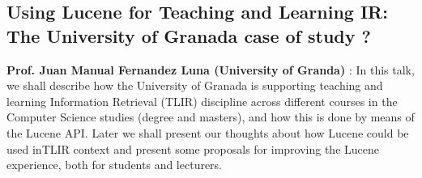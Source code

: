 \subsection*{Using Lucene for Teaching and Learning IR: The 
University of Granada case of study ?} 
{\bf  Prof. Juan Manual Fernandez Luna (University of Granda) }:
In this talk, we shall describe how the University of Granada is 
supporting teaching and learning Information Retrieval (TLIR) discipline 
across different courses in the Computer Science studies (degree and 
masters), and how this is done by means of the Lucene API. Later we 
shall present our thoughts about how Lucene could be used inTLIR context 
and present some proposals for improving the Lucene experience, both for 
students and lecturers.